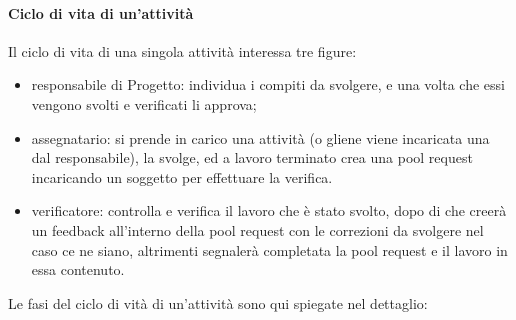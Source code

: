 \paragraph{Ciclo di vita di un'attività}
Il ciclo di vita di una singola attività interessa tre figure:
\begin{itemize}
    \item responsabile di Progetto: individua i compiti da svolgere, e una volta che essi vengono svolti e verificati li approva;
    \item assegnatario: si prende in carico una attività (o gliene viene incaricata una dal responsabile), la svolge, ed a lavoro terminato crea una pool request incaricando un soggetto per effettuare la verifica.
    \item verificatore: controlla e verifica il lavoro che è stato svolto, dopo di che creerà un feedback all'interno della pool request con le correzioni da svolgere nel caso ce ne siano, altrimenti segnalerà completata la pool request e il lavoro in essa contenuto.
\end{itemize}
Le fasi del ciclo di vità di un'attività sono qui spiegate nel dettaglio:
